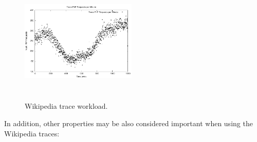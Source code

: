 


\begin{figure}
\begin{center}
\includegraphics[width=0.49\textwidth, height=6cm]{./images/traceWorkload}
\end{center}
\caption{Wikipedia trace workload.}
\label{workload}
\end{figure}

In addition, other properties may be also considered important when using the Wikipedia traces:

